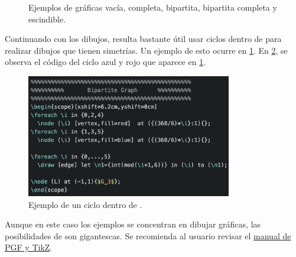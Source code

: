 \begin{figure}[ht!]
\caption{Ejemplos de gr\'aficas vac\'ia, completa,
bipartita, bipartita completa y escindible.}
\label{fig:fam1}
\end{figure}

Continuando con los dibujos, resulta bastante \'util usar ciclos 
dentro de  para realizar dibujos que tienen simetr\'ias.   Un ejemplo
de esto ocurre en \cref{fig:fam1}.   En \cref{fig:tikzFor}, se observa el
c\'odigo del ciclo azul y rojo que aparece en \cref{fig:fam1}.

\begin{figure}[ht!]
  \centering
  \includegraphics[width=0.8\textwidth]{recursos/capturas/tikzfor}
  \caption{Ejemplo de un ciclo  dentro de .}
  \label{fig:tikzFor}
\end{figure}

Aunque en este caso los ejemplos se concentran en dibujar gr\'aficas, las
posibilidades de  son gigantescas.   Se recomienda al usuario revisar
el \href{https://mirror.las.iastate.edu/tex-archive/graphics/pgf/base/doc/%
pgfmanual.pdf}{manual de PGF y TikZ}.


